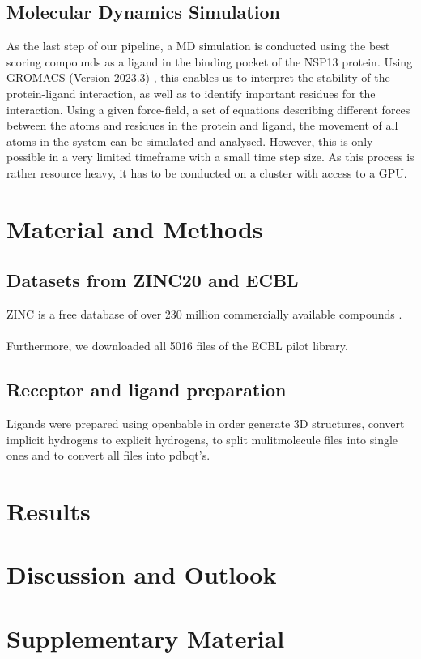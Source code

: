 \documentclass[11pt, letterpaper, titlepage]{article}
\begin{document}
\subsection{Molecular Dynamics Simulation}
As the last step of our pipeline, a MD simulation is conducted using the best scoring compounds as a ligand in the binding pocket of the NSP13 protein. Using GROMACS (Version 2023.3) \cite{package_GROMACS}, this enables us to interpret the stability of the protein-ligand interaction, as well as to identify important residues for the interaction. Using a given force-field, a set of equations describing different forces between the atoms and residues in the protein and ligand, the movement of all atoms in the system can be simulated and analysed. However, this is only possible in a very limited timeframe with a small time step size. As this process is rather resource heavy, it has to be conducted on a cluster with access to a GPU. 


\section{Material and Methods}
\subsection{Datasets from ZINC20 and ECBL}
ZINC is a free database of over 230 million commercially available compounds \cite{Irwin.2020}.\\
\\
Furthermore, we downloaded all 5016 files of the ECBL pilot library.

\subsection{Receptor and ligand preparation}
Ligands were prepared using openbable in order generate 3D structures, convert implicit hydrogens to explicit hydrogens, to split mulitmolecule files into single ones and to convert all files into pdbqt's.
\section{Results}

\FloatBarrier

\section{Discussion and Outlook}

\section{Supplementary Material}

\pagebreak
\FloatBarrier


\end{document}
